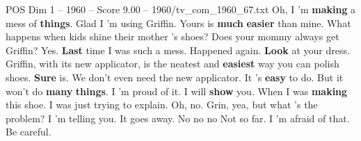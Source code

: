 \begin{textsample}{POS Dim 1 – 1960 – Score 9.00 – 1960/tv\_com\_1960\_67.txt}  \label{ex:f1_pos_021}
Oh, I 'm \textbf{making} a mess of \textbf{things}.
Glad I 'm using Griffin.
Yours is \textbf{much} \textbf{easier} than mine.
What happens when kids shine their mother 's shoes?
Does your mommy always get Griffin?
Yes. \textbf{Last} time I was such a mess.
Happened again. \textbf{Look} at your dress.
Griffin, with its new applicator, is the neatest and \textbf{easiest} way you can polish shoes. \textbf{Sure} is.
We don't even need the new applicator.
It 's \textbf{easy} to do.
But it won't do \textbf{many} \textbf{things}.
I 'm proud of it.
I will \textbf{show} you.
When I was \textbf{making} this shoe.
I was just trying to explain.
Oh, no.
Grin, yea, but what 's the problem?
I 'm telling you.
It goes away.
No no no Not so far.
I 'm afraid of that.
Be careful.

\end{textsample}
